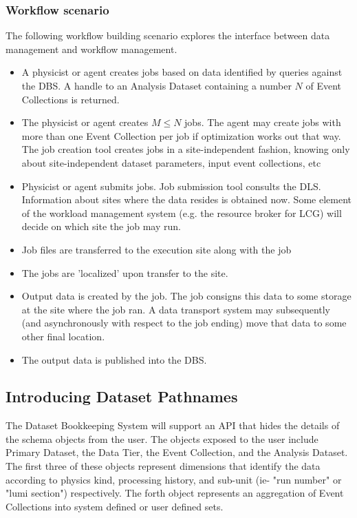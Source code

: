 \documentclass{cmspaper}
\begin{document}
\subsubsection{Workflow scenario}

The following workflow building scenario explores the 
interface between data management and workflow management.
\begin{itemize}
\item A physicist or agent creates jobs based on data identified by queries against 
the DBS.  A handle to an Analysis Dataset containing a number $N$ of
Event Collections is returned.  
\item The physicist or agent creates $M \le N$ jobs.  The agent may create jobs with more than 
one Event Collection per job if optimization works out that way.  The job 
creation tool creates jobs in a site-independent fashion, knowing only about 
site-independent dataset parameters, input event collections, etc 
\item Physicist or agent submits jobs. Job submission tool consults the DLS. 
Information about sites where the data resides is obtained now. Some element
of the workload management system (e.g. the resource broker for LCG) will
decide on which site the job may run.

\item Job files are transferred to the execution site along with the job 
\item The jobs are 'localized' upon transfer to the site. 
\item Output data is created by the job. The job consigns this data to
some storage at the site where the job ran. A data transport system may
subsequently (and asynchronously with respect to the job ending) move that 
data to some other final location.
\item The output data is published into the DBS.
\end{itemize}




\subsection{Introducing Dataset Pathnames}

  The Dataset Bookkeeping System will support an API that hides the details of the 
schema objects from the user.  The objects exposed to the user include Primary Dataset, 
the Data Tier, the Event Collection, and the Analysis Dataset.  
The first three of these objects represent dimensions that identify the data 
according to physics kind, processing history, and sub-unit 
(ie- "run number" or "lumi section") respectively.  The forth object represents an 
aggregation of Event Collections into system defined or user defined sets.  
\end{document}

